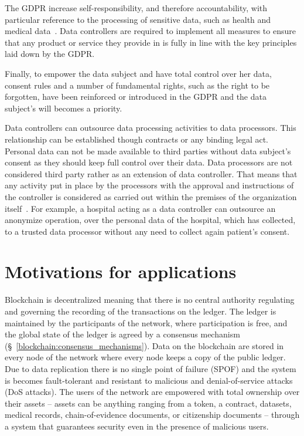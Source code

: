 The GDPR increase self-responsibility, and therefore accountability, with particular reference to the processing of sensitive data, such as health and medical data~\cite{mhmd}. Data controllers are required to implement all measures to ensure that any product or service they provide in is fully in line with the key principles laid down by the GDPR.

Finally, to empower the data subject and have total control over her data, consent rules and a number of fundamental rights, such as the right to be forgotten, have been reinforced or introduced in the GDPR and the data subject's will becomes a priority.

Data controllers can outsource data processing activities to data processors. This relationship can be established though contracts or any binding legal act. Personal data can not be made available to third parties without data subject's consent as they should keep full control over their data. Data processors are not considered third party rather as an extension of data controller. That means that any activity put in place by the processors with the approval and instructions of the controller is considered as carried out within the premises of the organization itself~\cite{mhmd}. For example, a hospital acting as a data controller can outsource an anonymize operation, over the personal data of the hospital, which has collected, to a trusted data processor without any need to collect again patient's consent.

\section{Motivations for applications}\label{problem:motivations}

Blockchain is decentralized meaning that there is no central authority regulating and governing the recording of the transactions on the ledger. The ledger is maintained by the participants of the network, where participation is free, and the global state of the ledger is agreed by a consensus mechanism (§~\ref{blockchain:consensus_mechanisms}). Data on the blockchain are stored in every node of the network where every node keeps a copy of the public ledger. Due to data replication there is no single point of failure (SPOF) and the system is becomes fault-tolerant and resistant to malicious and denial-of-service attacks (DoS attacks). The users of the network are empowered with total ownership over their assets -- assets can be anything ranging from a token, a contract, datasets, medical records, chain-of-evidence documents, or citizenship documents -- through a system that guarantees security even in the presence of malicious users.

